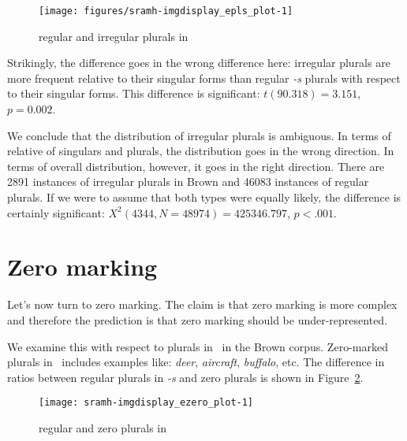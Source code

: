 \documentclass[output=paper,
modfonts
]{LSP/langsci}
\begin{document}
\begin{figure}
\caption{ regular and irregular plurals in \e}
\label{fig:epls}
\begin{knitrout}
\color{fgcolor}
 \texttt{[image: figures/sramh-imgdisplay\_epls\_plot-1]} 
\end{knitrout}
\end{figure}

Strikingly, the difference goes in the wrong difference here: irregular plurals are more frequent relative to their singular forms than regular \emph{-s} plurals with respect to their singular forms. This difference is significant: $t(90.318) = 3.151$, $p =  0.002$.


We conclude that the distribution of irregular plurals is ambiguous. In terms of relative  of singulars and plurals, the distribution goes in the wrong direction. In terms of overall distribution, however, it goes in the right direction. There are 2891 instances of irregular plurals in Brown and 46083 instances of regular plurals. If we were to assume that both types were equally likely, the difference is certainly significant: $X^2(4344, N = 48974) = 425346.797$, $p < .001$.

\section{Zero marking}

Let's now turn to zero marking. The claim is that zero marking is more complex and therefore the prediction is that zero marking should be under-represented.

We examine this with respect to plurals in \e\ in the Brown corpus. Zero-marked plurals in \e\ includes examples like: \emph{deer}, \emph{aircraft}, \emph{buffalo}, etc. The difference in ratios between regular plurals in \emph{-s} and zero plurals is shown in Figure~\ref{fig:ezero}.

\begin{figure}
\caption{ regular and zero plurals in \e}
\label{fig:ezero}
\begin{knitrout}
\color{fgcolor}
 \texttt{[image: sramh-imgdisplay\_ezero\_plot-1]} 
\end{knitrout}
\end{figure}
\end{document}
